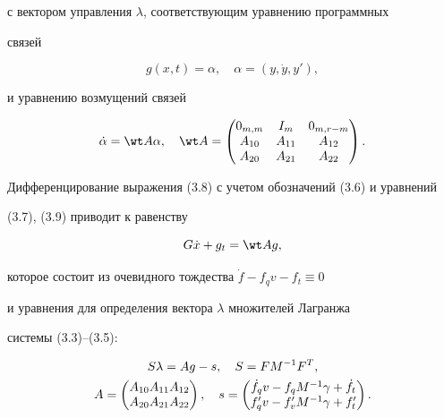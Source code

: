 с вектором управления $\lambda$, соответствующим уравнению программных 


связей 


\begin{equation} 


g(x,t)=\alpha,\quad \alpha=(y,\Dot y,y'), 


\end{equation} 


и уравнению возмущений связей 


\begin{equation} 


\Dot\alpha=\wt A\alpha,\quad \wt A= 


\begin{pmatrix} 


0_{m, m} & I_m & 0_{m,r-m} \\ A_{10} & A_{11} & A_{12} \\ 


A_{20} & A_{21} & A_{22} 


\end{pmatrix} 


. 


\end{equation} 


 


Дифференцирование выражения (3.8) с учетом обозначений (3.6) и уравнений 


(3.7), (3.9) приводит к равенству 


\begin{equation} 


G\Dot x+g_t=\wt A g, 


\end{equation} 


которое состоит из очевидного тождества $\Dot f-f_q v-f_t\equiv0$ 


и уравнения для определения вектора $\lambda$ множителей Лагранжа 


системы (3.3)--(3.5): 


\begin{gather} 


S\lambda=A g-s,\quad S=F M^{-1}F^T,\\ 


A= 


\begin{pmatrix} 


A_{10}A_{11}A_{12} \\ A_{20}A_{21}A_{22} 


\end{pmatrix} 


,\quad s= 


\begin{pmatrix} 


\Dot f_q v-f_q M^{-1}\gamma+\Dot f_t \\ 


f'_q v-f'_v M^{-1}\gamma+f'_t 


\end{pmatrix} 


.\notag 


\end{gather} 


